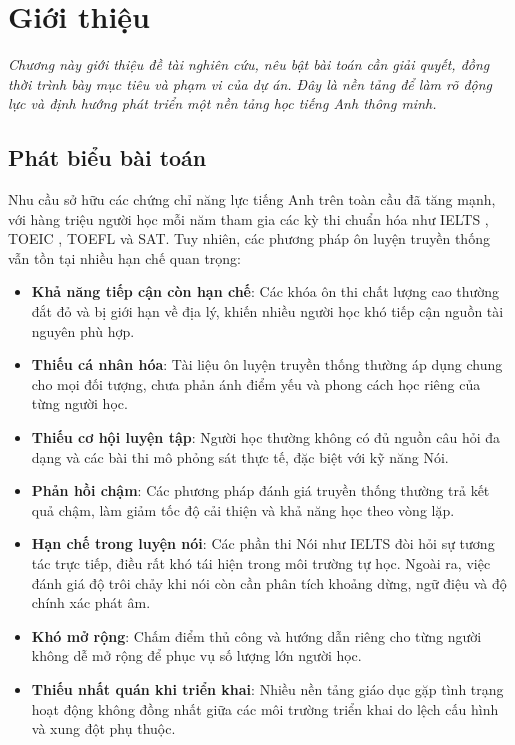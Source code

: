 \chapter{Giới thiệu}
\textit{Chương này giới thiệu đề tài nghiên cứu, nêu bật bài toán cần giải quyết, đồng thời trình bày mục tiêu và phạm vi của dự án. Đây là nền tảng để làm rõ động lực và định hướng phát triển một nền tảng học tiếng Anh thông minh.}


\section{Phát biểu bài toán}
Nhu cầu sở hữu các chứng chỉ năng lực tiếng Anh trên toàn cầu đã tăng mạnh, với hàng triệu người học mỗi năm tham gia các kỳ thi chuẩn hóa như IELTS \cite{ielts_official}, TOEIC \cite{toeic_official}, TOEFL và SAT. Tuy nhiên, các phương pháp ôn luyện truyền thống vẫn tồn tại nhiều hạn chế quan trọng:

\begin{itemize}
\item \textbf{Khả năng tiếp cận còn hạn chế}: Các khóa ôn thi chất lượng cao thường đắt đỏ và bị giới hạn về địa lý, khiến nhiều người học khó tiếp cận nguồn tài nguyên phù hợp.
\item \textbf{Thiếu cá nhân hóa}: Tài liệu ôn luyện truyền thống thường áp dụng chung cho mọi đối tượng, chưa phản ánh điểm yếu và phong cách học riêng của từng người học.
\item \textbf{Thiếu cơ hội luyện tập}: Người học thường không có đủ nguồn câu hỏi đa dạng và các bài thi mô phỏng sát thực tế, đặc biệt với kỹ năng Nói.
\item \textbf{Phản hồi chậm}: Các phương pháp đánh giá truyền thống thường trả kết quả chậm, làm giảm tốc độ cải thiện và khả năng học theo vòng lặp.
\item \textbf{Hạn chế trong luyện nói}: Các phần thi Nói như IELTS đòi hỏi sự tương tác trực tiếp, điều rất khó tái hiện trong môi trường tự học. Ngoài ra, việc đánh giá độ trôi chảy khi nói còn cần phân tích khoảng dừng, ngữ điệu và độ chính xác phát âm.
\item \textbf{Khó mở rộng}: Chấm điểm thủ công và hướng dẫn riêng cho từng người không dễ mở rộng để phục vụ số lượng lớn người học.
\item \textbf{Thiếu nhất quán khi triển khai}: Nhiều nền tảng giáo dục gặp tình trạng hoạt động không đồng nhất giữa các môi trường triển khai do lệch cấu hình và xung đột phụ thuộc.
\end{itemize}


